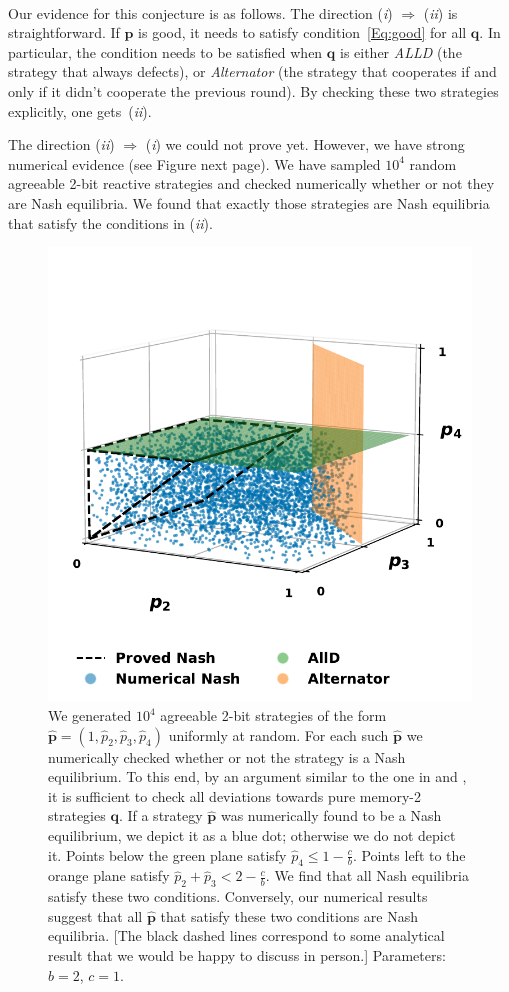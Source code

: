 \documentclass{article}
\theoremstyle{definition}
\begin{document}
~\\
Our evidence for this conjecture is as follows. The direction ({\it i}) $\Rightarrow$ ({\it ii}) is straightforward. If $\mathbf{p}$ is good, it needs to satisfy condition~\eqref{Eq:good} for all $\mathbf{q}$. In particular, the condition needs to be satisfied when $\mathbf{q}$ is either \emph{ALLD} (the strategy that always defects), or \emph{Alternator} (the strategy that cooperates if and only if it didn't cooperate the previous round). By checking these two strategies explicitly, one gets~({\it ii}). 

The direction  ({\it ii}) $\Rightarrow$ ({\it i}) we could not prove yet. However, we have strong numerical evidence (see Figure next page). We have sampled $10^4$ random agreeable 2-bit reactive strategies and checked numerically whether or not they are Nash equilibria. We found that exactly those strategies are Nash equilibria that satisfy the conditions in ({\it ii}).


\begin{figure}[t]
  \centering
  \includegraphics[width=.5\textwidth]{static/for_akin.pdf}
  \caption{We generated $10^4$ agreeable 2-bit strategies of the form $\mathbf{\hat{p}}=(1,\hat{p}_2,\hat{p}_3,\hat{p}_4)$ uniformly at random. 
  For each such $\mathbf{\hat{p}}$ we numerically checked whether or not the strategy is a Nash equilibrium. 
  To this end, by an argument similar to the one in \citep{press:PNAS:2012} and  \citep{mcavoy:PRSA:2019}, it is sufficient to check all deviations towards pure memory-2 strategies $\mathbf{q}$.
  If a strategy $\mathbf{\hat{p}}$ was numerically found to be a Nash equilibrium, we depict it as a blue dot; otherwise we do not depict it. 
  Points below the green plane satisfy $\hat{p}_4 \leq 1\!-\! \frac{c}{b}$. 
  Points left to the orange plane satisfy $\hat{p}_2 + \hat{p}_3 < 2-\frac{c}{b}$.
  We find that all Nash equilibria satisfy these two conditions. 
  Conversely, our numerical results suggest that all $\mathbf{\hat{p}}$ that satisfy these two conditions are Nash equilibria.
  [The black dashed lines correspond to some analytical result that we would be happy to discuss in person.] Parameters: $b\!=\!2$, $c\!=\!1$.
  }
\end{figure}

~\\

\end{document}
